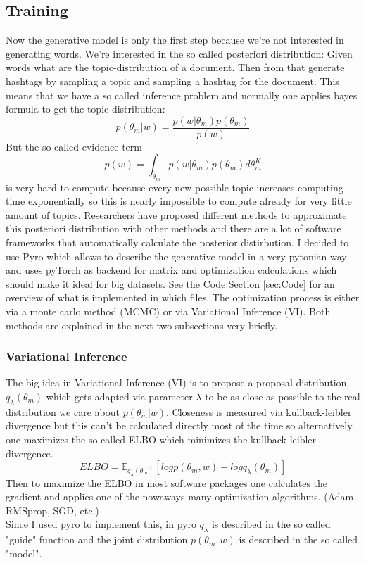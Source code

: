 \documentclass[10pt,conference,compsocconf]{IEEEtran}
\begin{document}
\subsection{Training}
Now the generative model is only the first step because we're not interested in generating words. We're interested in the so called posteriori distribution: Given words what are the topic-distribution of a document. Then from that generate hashtags by sampling a topic and sampling a hashtag for the document. This means that we have a so called inference problem and normally one applies bayes formula to get the topic distribution: \[ p(\theta_m | w) = \frac{p(w | \theta_m)p(\theta_m)}{p(w)} \] But the so called evidence term \[p(w) = \int_{\theta_m} p(w | \theta_m)p(\theta_m) d\theta_m^K \] is very hard to compute because every new possible topic increases computing time exponentially so this is nearly impossible to compute already for very little amount of topics. 
Researchers have proposed different methods to approximate this posteriori distribution with other methods and there are a lot of software frameworks that automatically calculate the posterior distirbution. I decided to use Pyro \cite{bingham2018pyro} which allows to describe the generative model in a very pytonian way and uses pyTorch \cite{paszke2017automatic} as backend for matrix and optimization calculations which should make it ideal for big datasets. See the Code Section \ref{sec:Code} for an overview of what is implemented in which files.   The optimization process is either via a monte carlo method (MCMC) or via Variational Inference (VI). Both methods are explained in the next two subsections very briefly. 

\subsubsection{Variational Inference}
The big idea in Variational Inference (VI) is to propose a proposal distribution $q_\lambda(\theta_m)$ which gets adapted via parameter $\lambda$ to be as close as possible to the real distribution we care about $p(\theta_m | w)$. Closeness is measured via kullback-leibler divergence but this can't be calculated directly most of the time so alternatively one maximizes the so called ELBO which minimizes the kullback-leibler divergence. 
\[ ELBO = \mathbb{E}_{q_\lambda(\theta_m)} [log p(\theta_m, w) - log q_{\lambda}(\theta_m)] \]
Then to maximize the ELBO in most software packages one calculates the gradient and applies one of the nowaways many optimization algorithms. (Adam, RMSprop, SGD, etc.)\\
Since I used pyro to implement this, in pyro $q_\lambda$ is described in the so called "guide" function and the joint distribution $p(\theta_m, w)$ is described in the so called "model". 
\end{document}
